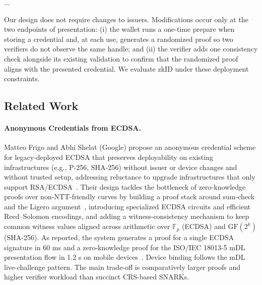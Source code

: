 ...

Our design does not require changes to issuers. Modifications occur only at the two endpoints of presentation: (i) the wallet runs a one-time prepare when storing a credential and, at each use, generates a randomized proof so two verifiers do not observe the same handle; and (ii) the verifier adds one consistency check alongside its existing validation to confirm that the randomized proof aligns with the presented credential. We evaluate zkID under these deployment constraints.

\subsection{Related Work}

\paragraph{Anonymous Credentials from ECDSA.}
Matteo Frigo and Abhi Shelat (Google) propose an anonymous credential scheme for legacy-deployed ECDSA that preserves deployability on existing infrastructures (e.g., P-256, SHA-256) without issuer or device changes and without trusted setup, addressing reluctance to upgrade infrastructures that only support RSA/ECDSA~\cite{cryptoeprint:2024/2010}. Their design tackles the bottleneck of zero-knowledge proofs over non-NTT-friendly curves by building a proof stack around sum-check and the Ligero argument~\cite{CCS:AHIV17}, introducing specialized ECDSA circuits and efficient Reed–Solomon encodings, and adding a witness-consistency mechanism to keep common witness values aligned across arithmetic over $\mathbb{F}_{p}$ (ECDSA) and $\mathrm{GF}(2^k)$ (SHA-256). As reported, the system generates a proof for a single ECDSA signature in 60 ms and a zero-knowledge proof for the ISO/IEC 18013-5 mDL presentation flow in 1.2 s on mobile devices~\cite[\S5.3,\S6.2]{cryptoeprint:2024/2010}. Device binding follows the mDL live-challenge pattern. The main trade-off is comparatively larger proofs and higher verifier workload than succinct CRS-based SNARKs.

